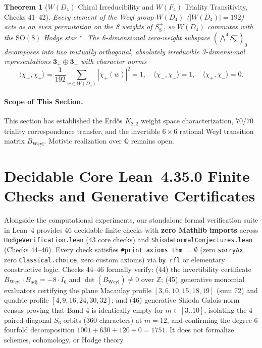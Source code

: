 \documentclass[11pt,a4paper]{amsart}
\newtheorem{theorem}{Theorem}[section]
\theoremstyle{definition}
\theoremstyle{remark}
\begin{document}
\begin{theorem}[$W(D_4)$ Chiral Irreducibility and $W(F_4)$ Triality Transitivity, Checks 41--42]
\label{thm:weyl_chiral_journal}
Every element of the Weyl group $W(D_4)$ ($|W(D_4)| = 192$) acts as an even permutation on the 8 weights of $S^+_8$, so $W(D_4)$ commutes with the $\mathrm{SO}(8)$ Hodge star $*$. The 6-dimensional zero-weight subspace $(\bigwedge^4 S^+_8)_0$ decomposes into two mutually orthogonal, absolutely irreducible 3-dimensional representations $\mathbf{3}_+ \oplus \mathbf{3}_-$ with character norms
\begin{equation}
\langle \chi_+, \chi_+ \rangle = \frac{1}{192} \sum_{w \in W(D_4)} |\chi_+(w)|^2 = 1, \quad \langle \chi_-, \chi_- \rangle = 1, \quad \langle \chi_+, \chi_- \rangle = 0.
\end{equation}
\end{theorem}

\paragraph{Scope of This Section.}
This section has established the Erd\H{o}s $K_{2,2}$ weight space characterization, $70/70$ triality correspondence transfer, and the invertible $6 \times 6$ rational Weyl transition matrix $B_{\mathrm{Weyl}}$. Motivic realization over $\mathbb{Q}$ remains open.

\section{Decidable Core Lean~4.35.0 Finite Checks and Generative Certificates}
\label{sec:thmFG}

Alongside the computational experiments, our standalone formal verification suite in Lean~4 \cite{Lean4} provides $46$ decidable finite checks with \textbf{zero Mathlib imports} across \texttt{HodgeVerification.lean} (43 core checks) and \texttt{ShiodaFormalConjectures.lean} (Checks 44--46). Every check satisfies \texttt{\#print axioms thm} $= \emptyset$ (zero \texttt{sorryAx}, zero \texttt{Classical.choice}, zero custom axioms) via \texttt{by rfl} or elementary constructive logic. Checks 44--46 formally verify: (44) the invertibility certificate $B_{\mathrm{Weyl}} \cdot B_{\mathrm{adj}} = -8 \cdot I_6$ and $\det(B_{\mathrm{Weyl}}) \neq 0$ over $\mathbb{Z}$; (45) generative monomial evaluators certifying the plane Macaulay profile $[3, 6, 10, 15, 18, 19]$ (sum 72) and quadric profile $[4, 9, 16, 24, 30, 32]$; and (46) generative Shioda Galois-norm census proving that Band 4 is identically empty for $m \in [3..10]$, isolating the 4 paired-diagonal $S_6$-orbits (360 characters) at $m=12$, and confirming the degree-6 fourfold decomposition $1001 + 630 + 120 + 0 = 1751$. It does not formalize schemes, cohomology, or Hodge theory.
\end{document}
